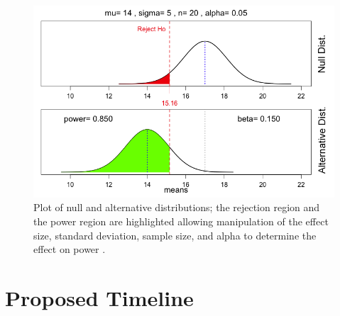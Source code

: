 \documentclass[11pt]{article}
\begin{document}
\begin{figure}[h!b]
\label{pwranal}
\begin{center}
\includegraphics[width=\textwidth]{pwranal1.png}
\end{center}
\caption{Plot of null and alternative distributions; the rejection region and the power region are highlighted allowing manipulation of the effect size, standard deviation, sample size, and alpha to determine the effect on power \cite{Ogle:2012qf}.} 
\end{figure}

\section{Proposed Timeline}
\end{document}
